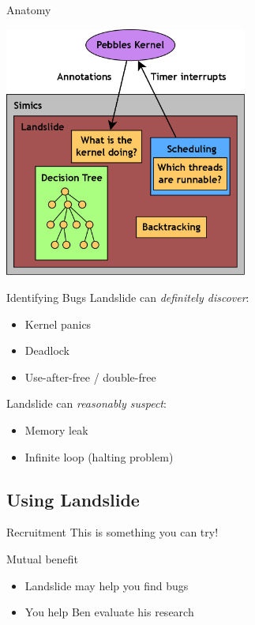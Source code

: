 \documentclass[xcolor=dvipsnames]{beamer}
\begin{document}
\begin{frame}{Anatomy}
	\begin{center}
	\includegraphics[width=0.6\textwidth]{landslide.png}
	\end{center}
\end{frame}

\begin{frame}{Identifying Bugs}
	Landslide can {\em definitely discover}:
	\begin{itemize}
		\item Kernel panics %
		\item Deadlock
		\item Use-after-free / double-free
	\end{itemize}
	\linegap
	Landslide can {\em reasonably suspect}:
	\begin{itemize}
		\item Memory leak
		\item Infinite loop (halting problem)
	\end{itemize}
\end{frame}


\subsection{Using Landslide}


\begin{frame}{Recruitment}
	This is something you can try!
	\linegap

	Mutual benefit
	\begin{itemize}
		\item Landslide may help you find bugs
		\item You help Ben evaluate his research
	\end{itemize}
\end{frame}
\end{document}
